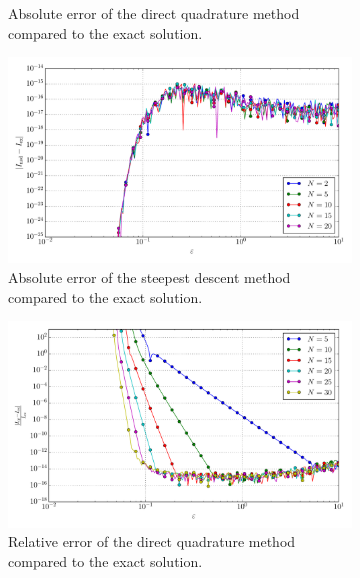\documentclass[a4paper,10pt]{article}
\begin{document}
\begin{figure}[ht!]
\begin{subfigure}[t]{0.5\linewidth}
    \caption{Absolute error of the direct quadrature method compared to the exact solution.}
    \label{fig:tp_2d_conv_eps_01_10_err_qr}
  \end{subfigure}
  \begin{subfigure}[t]{0.5\linewidth}
    \includegraphics[width=\linewidth]{./plots/tp_2d_conv_eps_(0,1)_(1,0)_err_nsd.pdf}
    \caption{Absolute error of the steepest descent method compared to the exact solution.}
    \label{fig:tp_2d_conv_eps_01_10_err_nsd}
  \end{subfigure}
  \begin{subfigure}[t]{0.5\linewidth}
    \includegraphics[width=\linewidth]{./plots/tp_2d_conv_eps_(0,1)_(1,0)_err_rel_qr.pdf}
    \caption{Relative error of the direct quadrature method compared to the exact solution.}
    \label{fig:tp_2d_conv_eps_01_10_err_rel_qr}
  \end{subfigure}
  \begin{subfigure}[t]{0.5\linewidth}

\end{subfigure}
\end{figure}
\end{document}
